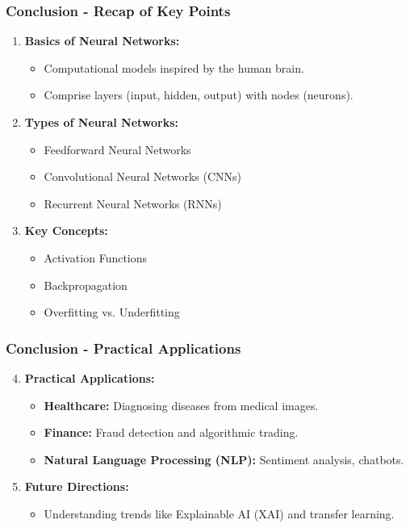 \documentclass[aspectratio=169]{beamer}
\begin{document}
\begin{frame}[fragile]
    \frametitle{Conclusion - Recap of Key Points}
    \begin{enumerate}
        \item \textbf{Basics of Neural Networks:} 
        \begin{itemize}
            \item Computational models inspired by the human brain.
            \item Comprise layers (input, hidden, output) with nodes (neurons).
        \end{itemize}

        \item \textbf{Types of Neural Networks:} 
        \begin{itemize}
            \item Feedforward Neural Networks
            \item Convolutional Neural Networks (CNNs)
            \item Recurrent Neural Networks (RNNs)
        \end{itemize}

        \item \textbf{Key Concepts:} 
        \begin{itemize}
            \item Activation Functions
            \item Backpropagation
            \item Overfitting vs. Underfitting
        \end{itemize}
    \end{enumerate}
\end{frame}

\begin{frame}[fragile]
    \frametitle{Conclusion - Practical Applications}
    \begin{enumerate}
        \setcounter{enumi}{3} %
        \item \textbf{Practical Applications:}
        \begin{itemize}
            \item \textbf{Healthcare:} Diagnosing diseases from medical images.
            \item \textbf{Finance:} Fraud detection and algorithmic trading.
            \item \textbf{Natural Language Processing (NLP):} Sentiment analysis, chatbots.
        \end{itemize}
        
        \item \textbf{Future Directions:} 
        \begin{itemize}
            \item Understanding trends like Explainable AI (XAI) and transfer learning.
        \end{itemize}
    \end{enumerate}
\end{frame}
\end{document}
